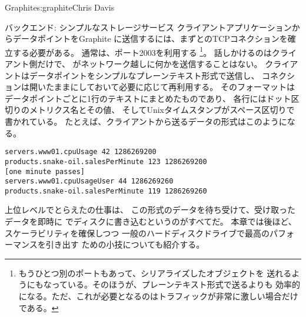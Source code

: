 \begin{aosachapter}{Graphite}{s:graphite}{Chris Davis}
\begin{aosasect1}{バックエンド: シンプルなストレージサービス}
クライアントアプリケーションからデータポイントをGraphite
に送信するには、まずとのTCPコネクションを確立する必要がある。
通常は、ポート2003を利用する
\footnote{もうひとつ別のポートもあって、シリアライズしたオブジェクトを
送れるようにもなっている。そのほうが、プレーンテキスト形式で送るよりも
効率的になる。ただ、これが必要となるのはトラフィックが非常に激しい場合だけである。}。
話しかけるのはクライアント側だけで、
がネットワーク越しに何かを送信することはない。
クライアントはデータポイントをシンプルなプレーンテキスト形式で送信し、
コネクションは開いたままにしておいて必要に応じて再利用する。
そのフォーマットはデータポイントごとに1行のテキストにまとめたものであり、
各行にはドット区切りのメトリクス名とその値、
そしてUnixタイムスタンプがスペース区切りで書かれている。
たとえば、クライアントから送るデータの形式はこのようになる。

\begin{verbatim}
servers.www01.cpuUsage 42 1286269200
products.snake-oil.salesPerMinute 123 1286269200
[one minute passes]
servers.www01.cpuUsageUser 44 1286269260
products.snake-oil.salesPerMinute 119 1286269260
\end{verbatim}

上位レベルでとらえたの仕事は、
この形式のデータを待ち受けて、受け取ったデータを即時に
でディスクに書き込むというのがすべてだ。
本章では後ほど、スケーラビリティを確保しつつ
一般のハードディスクドライブで最高のパフォーマンスを引き出す
ための小技についても紹介する。


\end{aosasect1}
\end{aosachapter}
